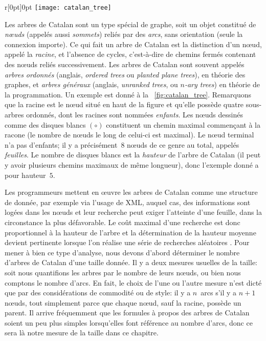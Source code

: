%
\begin{wrapfigure}[9]{r}[0pt]{0pt}
\centering
\texttt{[image: catalan\_tree]}
\caption{Arbre de Catalan de hauteur~5}
\label{fig:catalan_tree}
\end{wrapfigure}
Les arbres de Catalan sont un type spécial de graphe, soit un objet
constitué de \emph{n{\oe}uds} (appelés aussi \emph{sommets}) reliés
par des \emph{arcs}, sans orientation (seule la connexion importe). Ce
qui fait un arbre de Catalan est la distinction d'un n{\oe}ud, appelé
la \emph{racine}, et l'absence de cycles, c'est-à-dire de chemins
fermés contenant des n{\oe}uds reliés successivement. Les arbres de
Catalan sont souvent appelés \emph{arbres ordonnés} (anglais,
\emph{ordered trees} ou \emph{planted plane trees}), en théorie des
graphes, et \emph{arbres généraux} (anglais, \emph{unranked trees}, ou
\emph{\(n\)-ary trees}) en théorie de la programmation. Un exemple est
donné à la \fig~\ref{fig:catalan_tree}. Remarquons que la racine est
le n{\oe}ud situé en haut de la figure et qu'elle possède quatre
sous-arbres ordonnés, dont les racines sont nommées
\emph{enfants}. Les n{\oe}uds dessinés comme des disques blancs
\((\circ)\) constituent un chemin maximal commençant à la racone (le
nombre de n{\oe}uds le long de celui-ci est maximal). Le n{\oe}ud
terminal n'a pas d'enfants; il y a précisément~\(8\) n{\oe}uds de ce
genre au total, appelés \emph{feuilles}. Le nombre de disques blancs
est la \emph{hauteur} de l'arbre de Catalan (il peut y avoir plusieurs
chemins maximaux de même longueur), donc l'exemple donné a pour
hauteur~\(5\).

Les programmeurs mettent en {\oe}uvre les arbres de Catalan comme une
structure de donnée, par exemple via l'usage de \textsf{XML}, auquel
cas, des informations sont logées dans les n{\oe}uds et leur recherche
peut exiger l'atteinte d'une feuille, dans la circonstance la plus
défavorable. Le coût maximal d'une recherche est donc proportionnel à
la hauteur de l'arbre et la détermination de la hauteur moyenne
devient pertinente lorsque l'on réalise une série de recherches
aléatoires \citep{VitterFlajolet_1990}. Pour mener à bien ce type
d'analyse, nous devons d'abord déterminer le nombre d'arbres de
Catalan d'une taille donnée. Il y a deux mesures usuelles de la
taille: soit nous quantifions les arbres par le nombre de leurs
n{\oe}uds, ou bien nous comptons le nombre d'arcs. En fait, le choix
de l'une ou l'autre mesure n'est dicté que par des considérations de commodité ou de style: il y a \(n\)~arcs s'il y a \(n+1\) n{\oe}uds, tout simplement parce que chaque n{\oe}ud, sauf la racine, possède un parent. Il arrive fréquemment que les formules à propos des arbres de Catalan soient un peu plus simples lorsqu'elles font référence au nombre d'arcs, donc ce sera là notre mesure de la taille dans ce chapitre.

